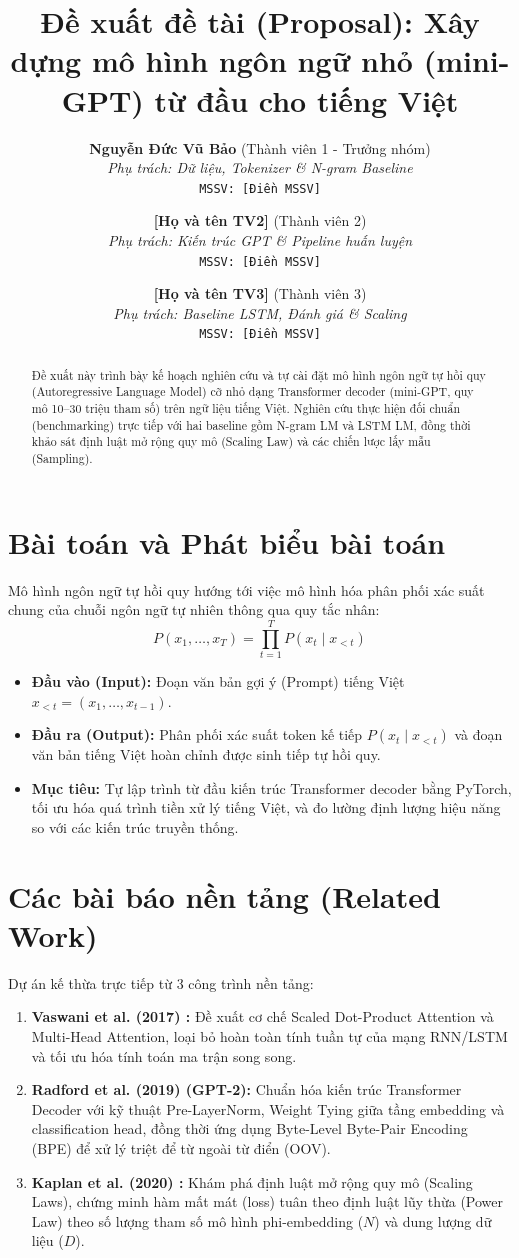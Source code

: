 \documentclass[11pt,a4paper]{article}
\title{\textbf{Đề xuất đề tài (Proposal): Xây dựng mô hình ngôn ngữ nhỏ (mini-GPT) từ đầu cho tiếng Việt}}
\author{
  \textbf{Nguyễn Đức Vũ Bảo} (Thành viên 1 - Trưởng nhóm) \\
  \textit{Phụ trách: Dữ liệu, Tokenizer \& N-gram Baseline} \\
  \texttt{MSSV: [Điền MSSV]}
  \and
  \textbf{[Họ và tên TV2]} (Thành viên 2) \\
  \textit{Phụ trách: Kiến trúc GPT \& Pipeline huấn luyện} \\
  \texttt{MSSV: [Điền MSSV]}
  \and
  \textbf{[Họ và tên TV3]} (Thành viên 3) \\
  \textit{Phụ trách: Baseline LSTM, Đánh giá \& Scaling} \\
  \texttt{MSSV: [Điền MSSV]}
}
\date{}
\begin{document}
\maketitle

\begin{abstract}
Đề xuất này trình bày kế hoạch nghiên cứu và tự cài đặt mô hình ngôn ngữ tự hồi quy (Autoregressive Language Model) cỡ nhỏ dạng Transformer decoder (mini-GPT, quy mô 10--30 triệu tham số) trên ngữ liệu tiếng Việt. Nghiên cứu thực hiện đối chuẩn (benchmarking) trực tiếp với hai baseline gồm N-gram LM và LSTM LM, đồng thời khảo sát định luật mở rộng quy mô (Scaling Law) và các chiến lược lấy mẫu (Sampling).
\end{abstract}

\section{Bài toán và Phát biểu bài toán}
Mô hình ngôn ngữ tự hồi quy hướng tới việc mô hình hóa phân phối xác suất chung của chuỗi ngôn ngữ tự nhiên thông qua quy tắc nhân:
\begin{equation}
P(x_1, \dots, x_T) = \prod_{t=1}^T P(x_t \mid x_{<t})
\end{equation}
\begin{itemize}
    \item \textbf{Đầu vào (Input):} Đoạn văn bản gợi ý (Prompt) tiếng Việt $x_{<t} = (x_1, \dots, x_{t-1})$.
    \item \textbf{Đầu ra (Output):} Phân phối xác suất token kế tiếp $P(x_t \mid x_{<t})$ và đoạn văn bản tiếng Việt hoàn chỉnh được sinh tiếp tự hồi quy.
    \item \textbf{Mục tiêu:} Tự lập trình từ đầu kiến trúc Transformer decoder bằng PyTorch, tối ưu hóa quá trình tiền xử lý tiếng Việt, và đo lường định lượng hiệu năng so với các kiến trúc truyền thống.
\end{itemize}

\section{Các bài báo nền tảng (Related Work)}
Dự án kế thừa trực tiếp từ 3 công trình nền tảng:
\begin{enumerate}
    \item \textbf{Vaswani et al. (2017) \cite{vaswani2017attention}:} Đề xuất cơ chế Scaled Dot-Product Attention và Multi-Head Attention, loại bỏ hoàn toàn tính tuần tự của mạng RNN/LSTM và tối ưu hóa tính toán ma trận song song.
    \item \textbf{Radford et al. (2019) \cite{radford2019language} (GPT-2):} Chuẩn hóa kiến trúc Transformer Decoder với kỹ thuật Pre-LayerNorm, Weight Tying giữa tầng embedding và classification head, đồng thời ứng dụng Byte-Level Byte-Pair Encoding (BPE) để xử lý triệt để từ ngoài từ điển (OOV).
    \item \textbf{Kaplan et al. (2020) \cite{kaplan2020scaling}:} Khám phá định luật mở rộng quy mô (Scaling Laws), chứng minh hàm mất mát (loss) tuân theo định luật lũy thừa (Power Law) theo số lượng tham số mô hình phi-embedding ($N$) và dung lượng dữ liệu ($D$).
\end{enumerate}
\end{document}
